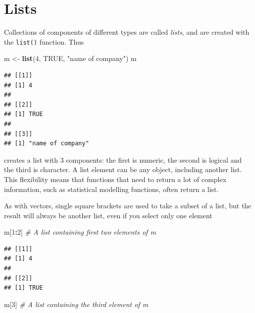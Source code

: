 \documentclass[
]{book}
\newenvironment{Shaded}{\begin{snugshade}}{\end{snugshade}}
\newcommand{\CommentTok}[1]{\textcolor[rgb]{0.56,0.35,0.01}{\textit{#1}}}
\newcommand{\ConstantTok}[1]{\textcolor[rgb]{0.56,0.35,0.01}{#1}}
\newcommand{\DecValTok}[1]{\textcolor[rgb]{0.00,0.00,0.81}{#1}}
\newcommand{\FunctionTok}[1]{\textcolor[rgb]{0.13,0.29,0.53}{\textbf{#1}}}
\newcommand{\NormalTok}[1]{#1}
\newcommand{\OtherTok}[1]{\textcolor[rgb]{0.56,0.35,0.01}{#1}}
\newcommand{\SpecialCharTok}[1]{\textcolor[rgb]{0.81,0.36,0.00}{\textbf{#1}}}
\newcommand{\StringTok}[1]{\textcolor[rgb]{0.31,0.60,0.02}{#1}}
\theoremstyle{definition}
\theoremstyle{definition}
\theoremstyle{definition}
\theoremstyle{definition}
\theoremstyle{remark}
\begin{document}
\section{Lists}\label{lists}

Collections of components of different types are called \emph{lists},
and are created with the \texttt{list()} function. Thus

\begin{Shaded}
\begin{Highlighting}[]
\NormalTok{m }\OtherTok{\textless{}{-}} \FunctionTok{list}\NormalTok{(}\DecValTok{4}\NormalTok{, }\ConstantTok{TRUE}\NormalTok{, }\StringTok{"name of company"}\NormalTok{)}
\NormalTok{m}
\end{Highlighting}
\end{Shaded}

\begin{verbatim}
## [[1]]
## [1] 4
## 
## [[2]]
## [1] TRUE
## 
## [[3]]
## [1] "name of company"
\end{verbatim}

creates a list with 3 components: the first is numeric, the second
is logical and the third is character. A list element can be any
object, including another list. This flexibility means that functions
that need to return a lot of complex information, such as statistical
modelling functions, often return a list.

As with vectors, single square brackets are used to take a subset of a
list, but the result will always be another list, even if you select
only one element

\begin{Shaded}
\begin{Highlighting}[]
\NormalTok{m[}\DecValTok{1}\SpecialCharTok{:}\DecValTok{2}\NormalTok{] }\CommentTok{\# A list containing first two elements of m}
\end{Highlighting}
\end{Shaded}

\begin{verbatim}
## [[1]]
## [1] 4
## 
## [[2]]
## [1] TRUE
\end{verbatim}

\begin{Shaded}
\begin{Highlighting}[]
\NormalTok{m[}\DecValTok{3}\NormalTok{] }\CommentTok{\# A list containing the third element of m}
\end{Highlighting}
\end{Shaded}
\end{document}
